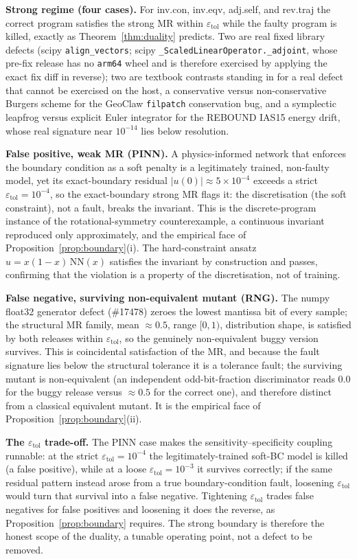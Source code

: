 \documentclass[manuscript,screen,review]{acmart}
\begin{document}
\textbf{Strong regime (four cases).} For inv.con, inv.eqv, adj.self, and
rev.traj the correct program satisfies the strong MR within
$\varepsilon_{\mathrm{tol}}$ while the faulty program is killed, exactly
as Theorem~\ref{thm:duality} predicts. Two are real fixed library defects (scipy
\texttt{align\_vectors}; scipy \texttt{\_ScaledLinearOperator.\_adjoint},
whose pre-fix release has no \texttt{arm64} wheel and is therefore
exercised by applying the exact fix diff in reverse); two are textbook
contrasts standing in for a real defect that cannot be exercised on the
host, a conservative versus non-conservative Burgers scheme for the
GeoClaw \texttt{filpatch} conservation bug, and a symplectic leapfrog
versus explicit Euler integrator for the REBOUND IAS15 energy drift, whose
real signature near $10^{-14}$ lies below resolution.

\textbf{False positive, weak MR (PINN).} A physics-informed network
that enforces the boundary condition as a soft penalty is a legitimately
trained, non-faulty model, yet its exact-boundary residual
$|u(0)| \approx 5\times10^{-4}$ exceeds a strict
$\varepsilon_{\mathrm{tol}} = 10^{-4}$, so the exact-boundary strong MR
flags it: the discretisation (the soft constraint), not a fault, breaks
the invariant. This is the discrete-program instance of the
rotational-symmetry counterexample, a continuous invariant reproduced
only approximately, and the empirical face of Proposition~\ref{prop:boundary}(i). The
hard-constraint ansatz $u = x(1-x)\,\mathrm{NN}(x)$ satisfies the invariant
by construction and passes, confirming that the violation is a property of
the discretisation, not of training.

\textbf{False negative, surviving non-equivalent mutant (RNG).} The
numpy float32 generator defect (\#17478) zeroes the lowest mantissa bit of
every sample; the structural MR family, mean $\approx 0.5$, range
$[0,1)$, distribution shape, is satisfied by both releases within
$\varepsilon_{\mathrm{tol}}$, so the genuinely non-equivalent buggy version
survives. This is coincidental satisfaction of the MR, and because the
fault signature lies below the structural tolerance it is a tolerance
fault; the surviving mutant is non-equivalent (an independent
odd-bit-fraction discriminator reads $0.0$ for the buggy release versus
$\approx 0.5$ for the correct one), and therefore distinct from a
classical equivalent mutant. It is the empirical face of
Proposition~\ref{prop:boundary}(ii).

\textbf{The $\varepsilon_{\mathrm{tol}}$ trade-off.} The PINN case makes
the sensitivity--specificity coupling runnable: at the strict
$\varepsilon_{\mathrm{tol}} = 10^{-4}$ the legitimately-trained soft-BC
model is killed (a false positive), while at a loose
$\varepsilon_{\mathrm{tol}} = 10^{-3}$ it survives correctly; if the same
residual pattern instead arose from a true boundary-condition fault,
loosening $\varepsilon_{\mathrm{tol}}$ would turn that survival into a
false negative. Tightening
$\varepsilon_{\mathrm{tol}}$ trades false negatives for false positives and
loosening it does the reverse, as Proposition~\ref{prop:boundary} requires. The strong
boundary is therefore the honest scope of the duality, a tunable
operating point, not a defect to be removed.
\end{document}
